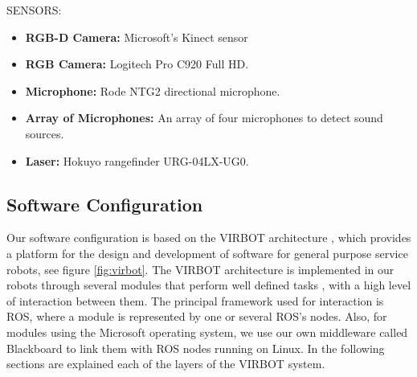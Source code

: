 \documentclass{llncs}
\begin{document}
SENSORS:

\begin{itemize}
	\item \textbf{RGB-D Camera:} Microsoft's Kinect sensor 
	\item \textbf{RGB Camera:} Logitech Pro C920 Full HD.
	\item \textbf{Microphone:} Rode NTG2 directional microphone.
	\item \textbf{Array of Microphones:} An array of four microphones to detect sound sources.
	\item \textbf{Laser:} Hokuyo rangefinder URG-04LX-UG0.
\end{itemize}

\subsection{Software Configuration}
Our software configuration is based on the VIRBOT architecture \cite{virbot}, 
which provides a platform for the design and development of software for general purpose service robots, see figure \ref{fig:virbot}. 
The VIRBOT architecture is implemented in our robots through several modules that perform well defined tasks \cite{muller}, with a 
high level of interaction between them. The principal framework used for interaction is ROS, where a module is represented by one or 
several ROS's nodes. Also, for modules using the Microsoft operating system, we use our own middleware called Blackboard to
link them with ROS nodes running on Linux.
In the following sections are explained each of the layers of the VIRBOT system.

\end{document}

